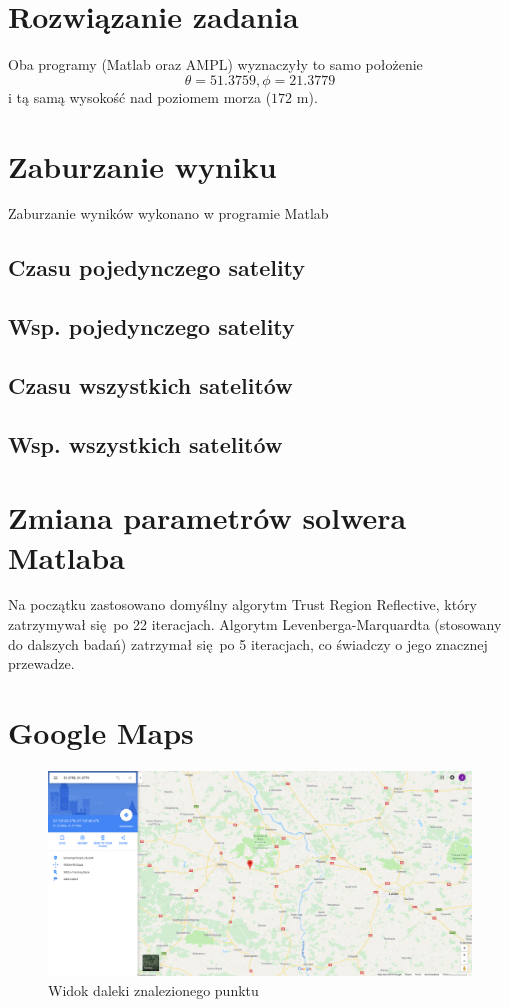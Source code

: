 \documentclass[]{article}
\begin{document}
\section{Rozwiązanie zadania}
Oba programy (Matlab oraz AMPL) wyznaczyły to samo położenie 
\[ \theta = 51.3759 , \phi = 21.3779 \] i tą samą wysokość nad poziomem morza ($172$ m).


\section{Zaburzanie wyniku}
Zaburzanie wyników wykonano w programie Matlab
\subsection{Czasu pojedynczego satelity}

\subsection{Wsp. pojedynczego satelity}
\subsection{Czasu wszystkich satelitów}
\subsection{Wsp. wszystkich satelitów}

\section{Zmiana parametrów solwera Matlaba}
Na początku zastosowano domyślny algorytm Trust Region Reflective, który zatrzymywał się po 22 iteracjach. Algorytm Levenberga-Marquardta (stosowany do dalszych badań) zatrzymał się po 5 iteracjach, co świadczy o jego znacznej przewadze.

\section{Google Maps}
\begin{figure}
	\centering
	\includegraphics[width=0.99\linewidth]{daleko}
	\caption{Widok daleki znalezionego punktu}
	\label{fig:daleko}
\end{figure}
\end{document}
